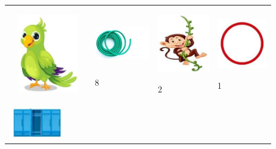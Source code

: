\begin{longtable}[]{@{}llll@{}}
\toprule
\begin{minipage}[t]{0.24\columnwidth}\raggedright\strut
\includegraphics[width=1.31458in,height=1.32014in]{media/image114.jpg}\strut
\end{minipage} & \begin{minipage}[t]{0.24\columnwidth}\raggedright\strut
\includegraphics[width=0.93056in,height=0.76042in]{media/image115.jpg}

8\strut
\end{minipage} & \begin{minipage}[t]{0.24\columnwidth}\raggedright\strut
\includegraphics[width=0.86956in,height=0.97145in]{media/image116.jpg}

2\strut
\end{minipage} & \begin{minipage}[t]{0.24\columnwidth}\raggedright\strut
\includegraphics[width=0.84722in,height=0.84722in]{media/image117.jpg}

1\strut
\end{minipage}\tabularnewline
\begin{minipage}[t]{0.24\columnwidth}\raggedright\strut
\includegraphics[width=0.95347in,height=0.54444in]{media/image118.jpg}


\end{minipage}
\end{longtable}
